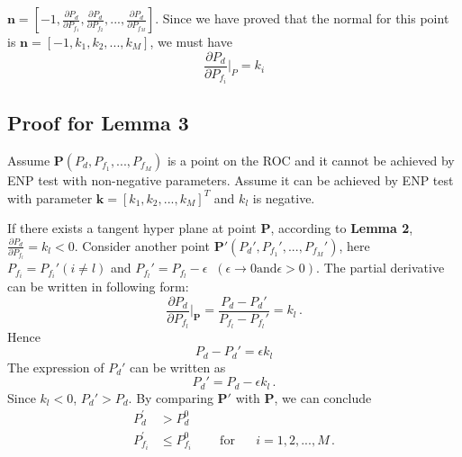 \documentclass[12pt,journal,a4paper,twoside,doublecolumn]{IEEEtran}
\begin{document}
\begin{spacing}{1.0}
 $\mathbf{n} = [-1, \frac{\partial P_d}{\partial P_{f_1}}, \frac{\partial P_d}{\partial P_{f_2}}, ..., \frac{\partial P_d}{\partial P_{f_M}}]$. Since we have proved that  the normal for this point is $\mathbf{n} = [-1, k_1, k_2, ..., k_M]$, we must have
\begin{equation}
\frac{\partial P_d}{\partial P_{f_i}}\bigg|_{P} = k_i
\end{equation}


\subsection{Proof for Lemma 3}
Assume $\mathbf{P} (P_d, P_{f_1}, ..., P_{f_M})$ is a point on the ROC and it cannot be achieved by ENP test with non-negative parameters. Assume it can be achieved by ENP test with parameter $\mathbf{k} = [k_1, k_2, ..., k_M]^T$ and $k_l$ is negative.

 If there exists a tangent hyper plane at point $\mathbf{P}$, according to \textbf{Lemma 2}, $\frac{\partial P_d}{\partial P_{f_l}} = k_l < 0$. Consider another point $\mathbf{P}' (P_d', P_{f_1}', ..., P_{f_M}')$, here $P_{f_i} = P_{f_i}' (i \neq l)$ and $P_{f_l}' = P_{f_l} - \epsilon \;\;(\epsilon \rightarrow 0 \text{and} \epsilon >0)$. The partial derivative can be written in following form:
 \begin{equation}
   \frac{\partial P_d}{ \partial P_{f_l}} \bigg|_{\mathbf{P}} = \frac{P_d - P_d'}{P_{f_l} - P_{f_l}'} = k_l\,.
 \end{equation}
 Hence
 \begin{equation}
   P_d - P_d' = \epsilon k_l
 \end{equation}
 The expression of $P_d'$ can be written as
 \begin{equation}
   P_d'= P_d - \epsilon k_l\,.
 \end{equation}
Since $k_l < 0$, $P_d' > P_d$. By comparing $\mathbf{P}'$ with $\mathbf{P}$, we can conclude
\begin{equation}
\begin{split}
  P_{d}^\prime &> P_{d}^0\\
  P_{f_i}^\prime &\leq P_{f_i}^0 \;\;\;\;\;\;\;\;\text{for}\;\;\;\;\;\; i=1, 2, ..., M\,.
\end{split}
\end{equation}


\end{spacing}
\end{document}

